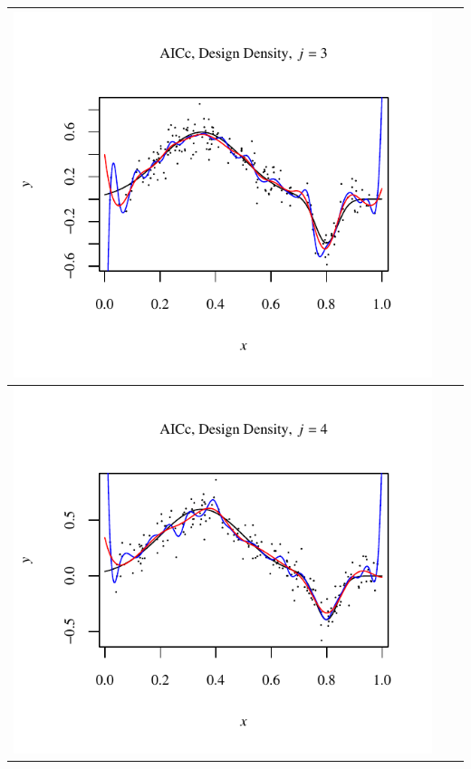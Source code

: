 \documentclass[11pt]{article}
\begin{document}
\begin{table}[h!]
\begin{center}
\begin{tabular}{| >{\centering\arraybackslash}m{2.1in} |  >{\centering\arraybackslash}m{2.1in} |  >{\centering\arraybackslash}m{2.1in}|}
      \includegraphics[width=1\linewidth,height=0.18\textheight]{Graphs/3/2/assignment5_a_3_2_3}\\\hline
      \includegraphics[width=1\linewidth,height=0.18\textheight]{Graphs/3/2/assignment5_a_3_2_4}&

\end{tabular}
\end{center}
\end{table}
\end{document}
